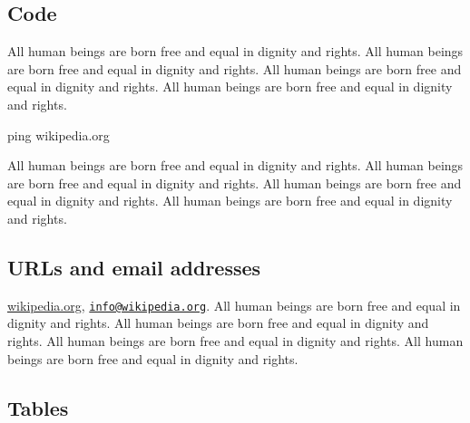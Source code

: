 \documentclass[
  ngerman,
  american,
  ]{scrartcl}
\newenvironment{Shaded}{}{}
\newcommand{\FunctionTok}[1]{\textcolor[rgb]{0.02,0.16,0.49}{#1}}
\newcommand{\NormalTok}[1]{#1}
\begin{document}
\subsection{Code}\label{code}

All human beings are born free and equal in dignity and rights. All
human beings are born free and equal in dignity and rights. All human
beings are born free and equal in dignity and rights. All human beings
are born free and equal in dignity and rights.

\begin{Shaded}
\begin{Highlighting}[]
\FunctionTok{ping}\NormalTok{ wikipedia.org}
\end{Highlighting}
\end{Shaded}

All human beings are born free and equal in dignity and rights. All
human beings are born free and equal in dignity and rights. All human
beings are born free and equal in dignity and rights. All human beings
are born free and equal in dignity and rights.

\subsection{URLs and email addresses}\label{urls-and-email-addresses}

\href{https://www.wikipedia.org/}{wikipedia.org},
\href{mailto:info@wikipedia.org}{\nolinkurl{info@wikipedia.org}}. All
human beings are born free and equal in dignity and rights. All human
beings are born free and equal in dignity and rights. All human beings
are born free and equal in dignity and rights. All human beings are born
free and equal in dignity and rights.

\subsection{Tables}\label{tables}
\end{document}
